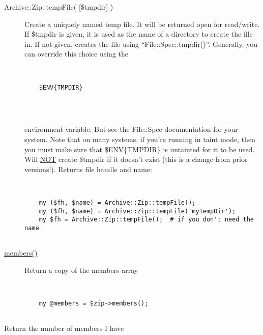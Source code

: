 \documentclass[]{article}
\renewcommand{\emph}[1]{\underline{#1}}
\begin{document}
\begin{description}
\item[Archive::Zip::tempFile( {[}\$tmpdir{]} )]
Create a uniquely named temp file. It will be returned open for
read/write. If \$tmpdir is given, it is used as the name of a directory
to create the file in. If not given, creates the file using
``File::Spec::tmpdir()''. Generally, you can override this choice using
the

~

\begin{verbatim}
    $ENV{TMPDIR}
    
\end{verbatim}

~

environment variable. But see the File::Spec documentation for your
system. Note that on many systems, if you're running in taint mode, then
you must make sure that \$ENV\{TMPDIR\} is untainted for it to be used.
Will \emph{NOT} create \$tmpdir if it doesn't exist (this is a change
from prior versions!). Returns file handle and name:

~

\begin{verbatim}
    my ($fh, $name) = Archive::Zip::tempFile();
    my ($fh, $name) = Archive::Zip::tempFile('myTempDir');
    my $fh = Archive::Zip::tempFile();  # if you don't need the name
    
\end{verbatim}
\end{description}


\begin{description}
\item[\emph{members()}]
Return a copy of the members array

~

\begin{verbatim}
    my @members = $zip->members();
    
\end{verbatim}
\end{description}

\begin{description}
\itemsep1pt\parskip0pt
\item[\emph{numberOfMembers()}]
Return the number of members I have
\end{description}
\end{document}

